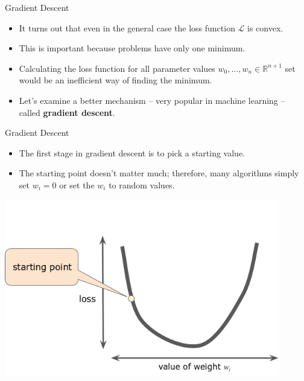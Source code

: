 \documentclass{beamer}
\begin{document}
\begin{frame}{Gradient Descent}
\begin{itemize}
\item It turns out that even in the general case the loss function $\mathcal{L}$ is convex.

\medskip
\item This is important because problems have only one minimum.

\medskip    
\item Calculating the loss function for all parameter values $w_0,\ldots,w_n\in\mathbb{R}^{n+1}$ set would be an inefficient way of finding the minimum.

\medskip    
\item Let's examine a better mechanism -- very popular in machine learning -- called {\bf gradient descent}.
\end{itemize}
\end{frame}


\begin{frame}{Gradient Descent}
\begin{itemize}
\item The first stage in gradient descent is to pick a starting value. 

\medskip
\item The starting point doesn't matter much; therefore, many algorithms simply set $w_i=0$ or set the $w_i$ to random values.
\end{itemize}

\includegraphics[width=0.9\textwidth]{images/GradientDescentStartingPoint.png}
\end{frame}

\end{document}
